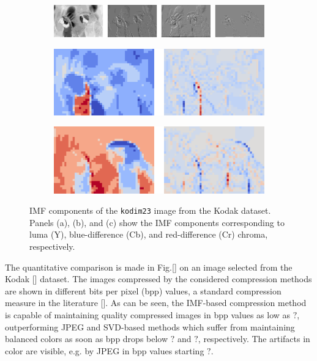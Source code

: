 \begin{figure}[t]
	\centering
	\begin{subfigure}{\textwidth}
		\centering
		\includegraphics[width=.95\textwidth]{figures/kodim23_y_componets.pdf}
		\caption{}
		\label{fig: y componets}
	\end{subfigure}
	\begin{subfigure}{.455\textwidth}
		\centering
		\vspace{10pt}
		\includegraphics[width=.95\textwidth]{figures/kodim23_cb_componets.pdf}
		\caption{}
		\label{fig: cb componets}
	\end{subfigure}%
	\begin{subfigure}{.45\textwidth}
		\centering
		\vspace{10pt}
		\includegraphics[width=.95\textwidth]{figures/kodim23_cr_componets.pdf}
		\caption{}
		\label{fig: cr componets}
	\end{subfigure}
	\caption{IMF components of the \texttt{kodim23} image from the Kodak dataset. Panels (a), (b), and (c) show the IMF components corresponding to luma (Y), blue-difference (Cb), and red-difference (Cr) chroma, respectively.}
	\label{fig:imf_components}
\end{figure}

The quantitative comparison is made in Fig.\ref{} on an image selected from the Kodak [] dataset. 
The images compressed by the considered compression methods are shown in different bits per pixel (bpp) values, a standard compression measure in the literature []. 
As can be seen, the IMF-based compression method is capable of maintaining quality compressed images in bpp values as low as $?$, outperforming JPEG and SVD-based methods which suffer from maintaining balanced colors as soon as bpp drops below $?$ and $?$, respectively. 
The artifacts in color are visible, e.g. by JPEG in bpp values starting $?$.



